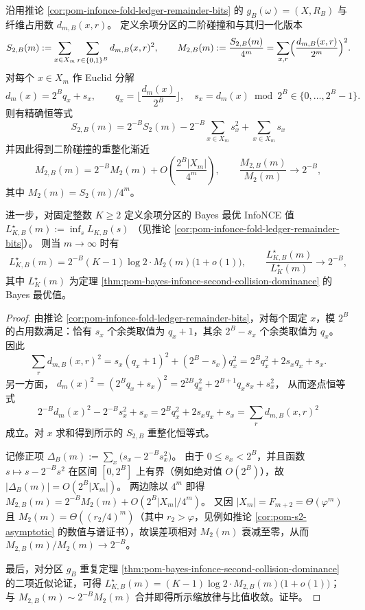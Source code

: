 \begin{theorem}\label{thm:pom-infonce-remainder-bits-second-order-renormalization}
沿用推论 \ref{cor:pom-infonce-fold-ledger-remainder-bits} 的 \(g_B(\omega)=(X,R_B)\) 与纤维占用数 \(d_{m,B}(x,r)\)。
定义余项分区的二阶碰撞和与其归一化版本
\[
S_{2,B}(m):=\sum_{x\in X_m}\sum_{r\in\{0,1\}^B} d_{m,B}(x,r)^2,
\qquad
M_{2,B}(m):=\frac{S_{2,B}(m)}{4^m}=\sum_{x,r}\Bigl(\frac{d_{m,B}(x,r)}{2^m}\Bigr)^2.
\]
对每个 \(x\in X_m\) 作 Euclid 分解
\[
d_m(x)=2^B q_x+s_x,\qquad q_x=\Big\lfloor\frac{d_m(x)}{2^B}\Big\rfloor,\quad s_x=d_m(x)\bmod 2^B\in\{0,\dots,2^B-1\}.
\]
则有精确恒等式
\[
\boxed{\;
S_{2,B}(m)=2^{-B}S_2(m)-2^{-B}\sum_{x\in X_m}s_x^2+\sum_{x\in X_m}s_x\;}
\]
并因此得到二阶碰撞的重整化渐近
\[
M_{2,B}(m)=2^{-B}M_2(m)+O\!\left(\frac{2^B|X_m|}{4^m}\right),
\qquad
\frac{M_{2,B}(m)}{M_2(m)}\longrightarrow 2^{-B},
\]
其中 \(M_2(m)=S_2(m)/4^m\)。
\par
进一步，对固定整数 \(K\ge 2\) 定义余项分区的 Bayes 最优 InfoNCE 值
\(
L_{K,B}^\star(m):=\inf_s L_{K,B}(s)
\)
（见推论 \ref{cor:pom-infonce-fold-ledger-remainder-bits}）。
则当 \(m\to\infty\) 时有
\[
L_{K,B}^\star(m)
=2^{-B}(K-1)\log 2\cdot M_2(m)\bigl(1+o(1)\bigr),
\qquad
\frac{L_{K,B}^\star(m)}{L_{K}^\star(m)}\longrightarrow 2^{-B},
\]
其中 \(L_K^\star(m)\) 为定理 \ref{thm:pom-bayes-infonce-second-collision-dominance} 的 Bayes 最优值。
\end{theorem}
\begin{proof}
由推论 \ref{cor:pom-infonce-fold-ledger-remainder-bits}，对每个固定 \(x\)，模 \(2^B\) 的占用数满足：恰有 \(s_x\) 个余类取值为 \(q_x+1\)，其余 \(2^B-s_x\) 个余类取值为 \(q_x\)。
因此
\[
\sum_{r}d_{m,B}(x,r)^2
=s_x(q_x+1)^2+(2^B-s_x)q_x^2
=2^Bq_x^2+2s_xq_x+s_x.
\]
另一方面，
\(
d_m(x)^2=(2^Bq_x+s_x)^2=2^{2B}q_x^2+2^{B+1}q_xs_x+s_x^2
\)，
从而逐点恒等式
\[
2^{-B}d_m(x)^2-2^{-B}s_x^2+s_x
=2^Bq_x^2+2s_xq_x+s_x
=\sum_{r}d_{m,B}(x,r)^2
\]
成立。对 \(x\) 求和得到所示的 \(S_{2,B}\) 重整化恒等式。
\par
记修正项
\(
\Delta_B(m):=\sum_x\bigl(s_x-2^{-B}s_x^2\bigr)
\)。
由于 \(0\le s_x<2^B\)，并且函数 \(s\mapsto s-2^{-B}s^2\) 在区间 \([0,2^B]\) 上有界（例如绝对值 \(O(2^B)\)），故
\(
|\Delta_B(m)|=O(2^B|X_m|)
\)。
两边除以 \(4^m\) 即得
\(
M_{2,B}(m)=2^{-B}M_2(m)+O(2^B|X_m|/4^m)
\)。
又因 \(|X_m|=F_{m+2}=\Theta(\varphi^m)\) 且 \(M_2(m)=\Theta((r_2/4)^m)\)（其中 \(r_2>\varphi\)，见例如推论 \ref{cor:pom-s2-asymptotic} 的数值与谱证书），故误差项相对 \(M_2(m)\) 衰减至零，从而 \(M_{2,B}(m)/M_2(m)\to 2^{-B}\)。
\par
最后，对分区 \(g_B\) 重复定理 \ref{thm:pom-bayes-infonce-second-collision-dominance} 的二项近似论证，可得
\(
L_{K,B}^\star(m)=(K-1)\log 2\cdot M_{2,B}(m)\bigl(1+o(1)\bigr)
\)；
与 \(M_{2,B}(m)\sim 2^{-B}M_2(m)\) 合并即得所示缩放律与比值收敛。证毕。
\end{proof}

